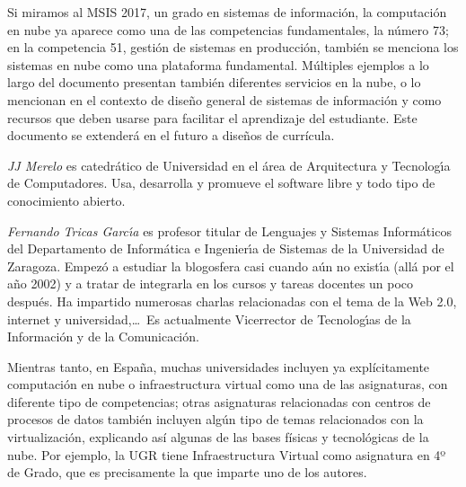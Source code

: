 \documentclass[twoside,10pt]{article}
\newcounter{num}
\begin{document}
\begin{multicols}{2}
Si miramos al MSIS 2017, un grado en sistemas de informaci\'on, la
computaci\'on en nube ya aparece como una de las competencias
fundamentales, la n\'umero 73; en la competencia 51, gesti\'on de
sistemas en producci\'on, tambi\'en se menciona los sistemas en nube como
una plataforma fundamental. M\'ultiples ejemplos a lo largo del
documento presentan tambi\'en diferentes servicios en la nube, o lo
mencionan en el contexto de dise\~no general de sistemas de
informaci\'on y como recursos que deben usarse para facilitar el
aprendizaje del estudiante. Este documento se extender\'a en el futuro a
dise\~nos de curr\'icula. 
  
\vspace{1ex} {\small{\begin{window} \noindent\emph{JJ Merelo} es catedr\'{a}tico de Universidad
en el \'area de Arquitectura y Tecnolog\'{\i}a de Computadores. Usa,
desarrolla y promueve el software libre y todo tipo de conocimiento
abierto. 
\end{window}}}

\medskip

{\small{\begin{window}
		\noindent \emph{Fernando Tricas Garc\'{\i}a} es profesor
		titular de Lenguajes y Sistemas Inform\'{a}ticos del Departamento
		de Inform\'{a}tica e Ingenier\'{\i}a de Sistemas de la Universidad de
		Zaragoza.  Empez\'{o} a estudiar la blogosfera casi cuando a\'{u}n no
		exist\'{\i}a (all\'{a} por el a\~{n}o 2002) y a tratar de integrarla en los
		cursos y tareas docentes un poco despu\'{e}s.  Ha impartido
		numerosas charlas relacionadas con el tema de la Web 2.0, 
		internet y universidad,\ldots\ 
		Es actualmente Vicerrector de Tecnolog\'{\i}as de la Informaci\'{o}n y
de la Comunicaci\'{o}n.   
		\end{window}}}

Mientras tanto, en España, muchas universidades incluyen ya
expl\'icitamente computaci\'on en nube o infraestructura virtual como una
de las asignaturas, con diferente tipo de competencias; otras
asignaturas relacionadas con centros de procesos de datos tambi\'en
incluyen alg\'un tipo de temas relacionados con la virtualizaci\'on,
explicando as\'i algunas de las bases f\'isicas y tecnol\'ogicas de la
nube. Por ejemplo, la UGR tiene Infraestructura Virtual como
asignatura en 4º de Grado, que es precisamente la que imparte uno de
los autores. 


\end{multicols}
\end{document}
